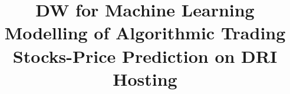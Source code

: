 \documentclass[conference]{IEEEtran}
\begin{document}
\makeatletter
\newcommand{\linebreakand}{%
 \end{@IEEEauthorhalign}
 \hfill\mbox{}\par
 \mbox{}\hfill\begin{@IEEEauthorhalign}
}

\title{DW for Machine Learning Modelling of Algorithmic Trading Stocks-Price Prediction on DRI Hosting
}






\end{document}
